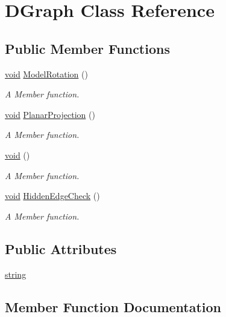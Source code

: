 \hypertarget{classDGraph}{}\section{D\+Graph Class Reference}
\label{classDGraph}
\subsection*{Public Member Functions}
\begin{DoxyCompactItemize}
\item 
\hyperlink{classDGraph_aac82f625da6ff0ac133237eaad059e64}{void} \hyperlink{classDGraph_a7e2b74827219e34c25c71ed31b99ea5e}{Model\+Rotation} ()
\begin{DoxyCompactList}\small\item\em A Member function. \end{DoxyCompactList}\item 
\hyperlink{classDGraph_aac82f625da6ff0ac133237eaad059e64}{void} \hyperlink{classDGraph_abaec70edea70ef4eb75418a7f12a0d57}{Planar\+Projection} ()
\begin{DoxyCompactList}\small\item\em A Member function. \end{DoxyCompactList}\item 
\hyperlink{classDGraph_aac82f625da6ff0ac133237eaad059e64}{void} ()
\begin{DoxyCompactList}\small\item\em A Member function. \end{DoxyCompactList}\item 
\hyperlink{classDGraph_aac82f625da6ff0ac133237eaad059e64}{void} \hyperlink{classDGraph_abdeeea49954b123c9cc7a48058e4a1e4}{Hidden\+Edge\+Check} ()
\begin{DoxyCompactList}\small\item\em A Member function. \end{DoxyCompactList}\end{DoxyCompactItemize}
\subsection*{Public Attributes}
\begin{DoxyCompactItemize}
\item 
\hyperlink{classDGraph_a89521648f39efc22e84cf18d52fcb877}{string}
\end{DoxyCompactItemize}


\subsection{Member Function Documentation}
